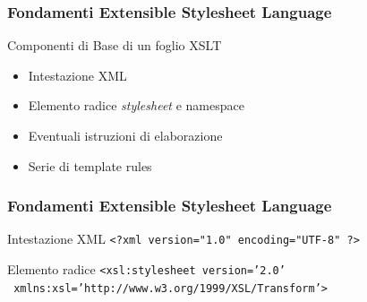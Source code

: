 \begin{frame}
    \frametitle{Fondamenti Extensible Stylesheet Language}
    \addtocounter{nframe}{1}
    

     \begin{block}{Componenti di Base di un foglio XSLT}
         \begin{itemize}
            \item Intestazione XML
            \item Elemento radice \textit{stylesheet} e namespace
            \item Eventuali istruzioni di elaborazione
            \item Serie di template rules
        \end{itemize}
     \end{block}
    
\end{frame}

\begin{frame}
    \frametitle{Fondamenti Extensible Stylesheet Language}
    \addtocounter{nframe}{1}
    

     \begin{block}{Intestazione XML}
        \texttt{<?xml version="1.0" encoding="UTF-8" ?>}
     \end{block}

     \begin{block}{Elemento radice}
        \texttt{<xsl:stylesheet version='2.0'}
            \\\texttt{  xmlns:xsl='http://www.w3.org/1999/XSL/Transform'>}
     \end{block}
    
\end{frame}

